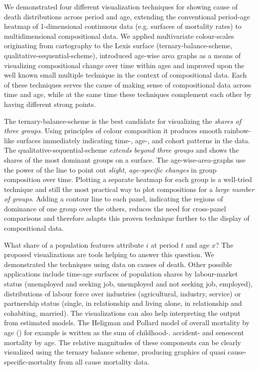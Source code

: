 \documentclass[a4paper, 12pt]{scrartcl}
\begin{document}
We demonstrated four different visualization techniques for showing cause of death distributions across period and age, extending the conventional period-age heatmap of 1-dimensional continuous data (e.g. surfaces of mortality rates) to multidimensional compositional data. We applied multivariate colour-scales originating from cartography to the Lexis surface (ternary-balance-scheme, qualitative-sequential-scheme), introduced age-wise area graphs as a means of visualizing compositional change over time within ages and improved upon the well known small multiple technique in the context of compositional data. Each of these techniques serves the cause of making sense of compositional data across time and age, while at the same time these techniques complement each other by having different strong points.

The ternary-balance-scheme is the best candidate for visualizing the \emph{shares of three groups}. Using principles of colour composition it produces smooth rainbow-like surfaces immediately indicating time-, age-, and cohort patterns in the data. The qualitative-sequential-scheme \emph{extends beyond three groups} and shows the shares of the most dominant groups on a surface. The age-wise-area-graphs use the power of the line to point out \emph{slight, age-specific changes} in group composition over time. Plotting a separate heatmap for each group is a well-tried technique and still the most practical way to plot compositions for a \emph{large number of groups}. Adding a contour line to each panel, indicating the regions of dominance of one group over the others, reduces the need for cross-panel comparisons and therefore adapts this proven technique further to the display of compositional data.

What share of a population features attribute $i$ at period $t$ and age $x$? The proposed visualizations are tools helping to answer this question. We demonstrated the techniques using data on causes of death. Other possible applications include time-age surfaces of population shares by labour-market status (unemployed and seeking job, unemployed and not seeking job, employed), distributions of labour force over industries (agricultural, industry, service) or partnership status (single, in relationship and living alone, in relationship and cohabiting, married). The visualizations can also help interpreting the output from estimated models. The Heligman and Pollard model of overall mortality by age (\cite{Heligman1980}) for example is written as the sum of childhood-. accident- and senescent mortality by age. The relative magnitudes of these components can be clearly visualized using the ternary balance scheme, producing graphics of quasi cause-specific-mortality from all cause mortality data.
\end{document}
